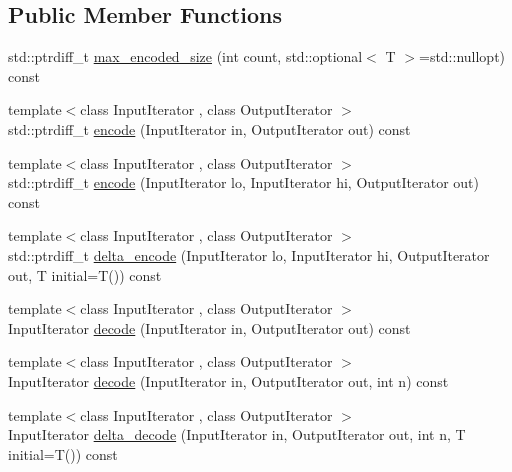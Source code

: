 \subsection*{Public Member Functions}
\begin{DoxyCompactItemize}
\item 
std\+::ptrdiff\+\_\+t \mbox{\hyperlink{structirk_1_1stream__vbyte__codec_ab547f75599a96a3d810d3abbada86d5c}{max\+\_\+encoded\+\_\+size}} (int count, std\+::optional$<$ T $>$=std\+::nullopt) const
\item 
{\footnotesize template$<$class Input\+Iterator , class Output\+Iterator $>$ }\\std\+::ptrdiff\+\_\+t \mbox{\hyperlink{structirk_1_1stream__vbyte__codec_a3547ab2ad7b449c26c96d996f4f7eb21}{encode}} (Input\+Iterator in, Output\+Iterator out) const
\item 
{\footnotesize template$<$class Input\+Iterator , class Output\+Iterator $>$ }\\std\+::ptrdiff\+\_\+t \mbox{\hyperlink{structirk_1_1stream__vbyte__codec_a6b3223677b8a8bb474ab3845dc199c8d}{encode}} (Input\+Iterator lo, Input\+Iterator hi, Output\+Iterator out) const
\item 
{\footnotesize template$<$class Input\+Iterator , class Output\+Iterator $>$ }\\std\+::ptrdiff\+\_\+t \mbox{\hyperlink{structirk_1_1stream__vbyte__codec_a4282c914d2b3975aab39afc2534e7e6c}{delta\+\_\+encode}} (Input\+Iterator lo, Input\+Iterator hi, Output\+Iterator out, T initial=T()) const
\item 
{\footnotesize template$<$class Input\+Iterator , class Output\+Iterator $>$ }\\Input\+Iterator \mbox{\hyperlink{structirk_1_1stream__vbyte__codec_a22e3adfa45fcb5f19a70720cc73c771f}{decode}} (Input\+Iterator in, Output\+Iterator out) const
\item 
{\footnotesize template$<$class Input\+Iterator , class Output\+Iterator $>$ }\\Input\+Iterator \mbox{\hyperlink{structirk_1_1stream__vbyte__codec_a8864b6ac48c12a0b25d8cab765474fdd}{decode}} (Input\+Iterator in, Output\+Iterator out, int n) const
\item 
{\footnotesize template$<$class Input\+Iterator , class Output\+Iterator $>$ }\\Input\+Iterator \mbox{\hyperlink{structirk_1_1stream__vbyte__codec_a960d285d3f6dda37976597743f0186e8}{delta\+\_\+decode}} (Input\+Iterator in, Output\+Iterator out, int n, T initial=T()) const
\end{DoxyCompactItemize}

